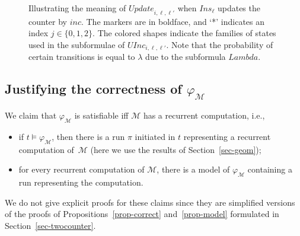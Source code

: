 \documentclass[a4paper,UKenglish,cleveref, autoref, thm-restate]{lipics-v2021}
\newcommand{\M}{\mathcal{M}}
\newcommand{\Ins}{\mathit{Ins}}
\newcommand{\FLambda}{\textit{Lambda}}
\newcommand{\Update}{\textit{Update}}
\newcommand{\Inc}{\textit{inc}}
\newcommand{\UInc}{\textit{UInc}}
\begin{document}
\begin{figure}[t]
    \caption{Illustrating the meaning of $\Update_{i,\ell,\ell'}$ when $\Ins_\ell$ updates the counter by $\Inc$. The markers are in boldface, and `*' indicates an index $j \in \{0,1,2\}$. The colored shapes indicate the families of states used in the subformulae of $\UInc_{i,\ell,\ell'}$. Note that the probability of certain transitions is equal to $\lambda$ due to the subformula $\FLambda$.}
\label{fig-update-inc}
\end{figure}
































\subsection{Justifying the correctness of $\varphi_\M$}
We claim that $\varphi_\M$ is satisfiable iff $\M$ has a recurrent computation, i.e., 
\begin{itemize}
    \item if $t \models \varphi_\M$, then there is a run $\pi$ initiated in $t$ representing a recurrent computation of~$\M$ (here we use the results of Section~\ref{sec-geom});
    \item for every recurrent computation of $\M$, there is a model of $\varphi_\M$ containing a run representing the computation. 
\end{itemize}
We do not give explicit proofs for these claims since they are simplified versions of the proofs of Propositions~\ref{prop-correct} and~\ref{prop-model} formulated in Section~\ref{sec-twocounter}. 
\end{document}
